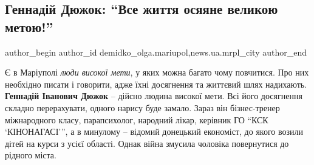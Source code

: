  
 
 
 
 
 
\subsection{Геннадій Дюжок: \enquote{Все життя осяяне великою метою!}}
\label{sec:12_08_2019.stz.news.ua.mrpl_city.1.gennadij_djuzhok_zhyttja_velyka_meta}
 
\ifcmt
 author_begin
   author_id demidko_olga.mariupol,news.ua.mrpl_city
 author_end
\fi

Є в Маріуполі \emph{люди високої мети}, у яких можна багато чому повчитися. Про них
необхідно писати і говорити, адже їхні досягнення та життєвий шлях надихають.
\textbf{Геннадій Іванович Дюжок} – дійсно людина високої мети. Всі його досягнення
складно перерахувати, одного нарису буде замало. Зараз він бізнес-тренер
міжнародного класу, парапсихолог, народний лікар, керівник ГО \enquote{КСК
\enquote{КІНОНАГАСІ}}, а в минулому – відомий донецький економіст, до якого возили дітей
на курси з усієї області. Однак війна змусила чоловіка повернутися до рідного
міста.


